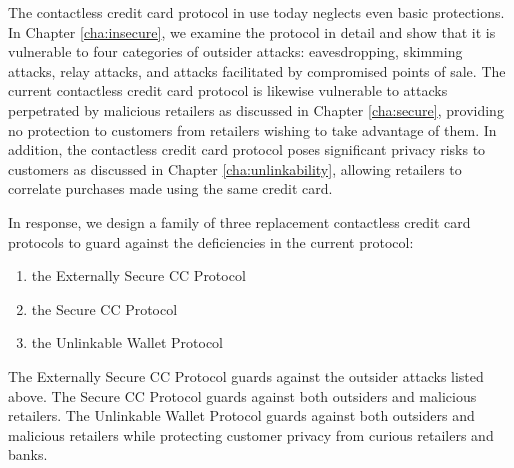 The contactless credit card protocol in use today neglects even basic protections.
In Chapter \ref{cha:insecure}, we examine the protocol in detail and show that it is vulnerable to four categories of outsider attacks:
  eavesdropping, skimming attacks, relay attacks, and attacks facilitated by compromised points of sale.
The current contactless credit card protocol is likewise vulnerable to attacks perpetrated by malicious retailers as discussed in Chapter \ref{cha:secure},
    providing no protection to customers from retailers wishing to take advantage of them.
In addition, the contactless credit card protocol poses significant privacy risks to customers as discussed in Chapter \ref{cha:unlinkability},
    allowing retailers to correlate purchases made using the same credit card.

In response, we design a family of three replacement contactless credit card protocols to guard against the deficiencies in the current protocol:
\begin{enumerate}
    \item the Externally Secure CC Protocol
    \item the Secure CC Protocol
    \item the Unlinkable Wallet Protocol
\end{enumerate}
The Externally Secure CC Protocol guards against the outsider attacks listed above.
The Secure CC Protocol guards against both outsiders and malicious retailers.
The Unlinkable Wallet Protocol guards against both outsiders and malicious retailers while protecting customer privacy from curious retailers and banks.
